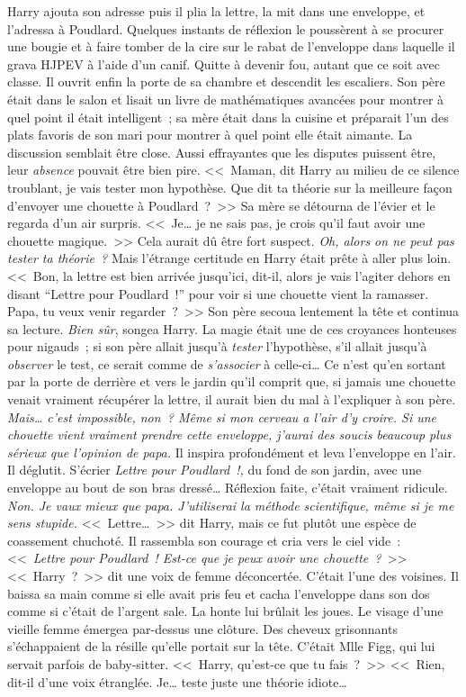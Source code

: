 Harry ajouta son adresse puis il plia la lettre, la mit dans une enveloppe, et l'adressa à Poudlard. Quelques instants de réflexion le poussèrent à se procurer une bougie et à faire tomber de la cire sur le rabat de l'enveloppe dans laquelle il grava HJPEV à l'aide d'un canif. Quitte à devenir fou, autant que ce soit avec classe.
Il ouvrit enfin la porte de sa chambre et descendit les escaliers. Son père était dans le salon et lisait un livre de mathématiques avancées pour montrer à quel point il était intelligent~; sa mère était dans la cuisine et préparait l'un des plats favoris de son mari pour montrer à quel point elle était aimante. La discussion semblait être close. Aussi effrayantes que les disputes puissent être, leur \emph{absence} pouvait être bien pire.
<<~Maman, dit Harry au milieu de ce silence troublant, je vais tester mon hypothèse. Que dit ta théorie sur la meilleure façon d'envoyer une chouette à Poudlard~?~>>
Sa mère se détourna de l'évier et le regarda d'un air surpris. <<~Je… je ne sais pas, je crois qu'il faut avoir une chouette magique.~>>
Cela aurait dû être fort suspect. \emph{Oh, alors on ne peut pas tester ta théorie~?} Mais l'étrange certitude en Harry était prête à aller plus loin.
<<~Bon, la lettre est bien arrivée jusqu'ici, dit-il, alors je vais l'agiter dehors en disant “Lettre pour Poudlard~!” pour voir si une chouette vient la ramasser. Papa, tu veux venir regarder~?~>>
Son père secoua lentement la tête et continua sa lecture. \emph{Bien sûr}, songea Harry. La magie était une de ces croyances honteuses pour nigauds~; si son père allait jusqu'à \emph{tester} l'hypothèse, s'il allait jusqu'à \emph{observer} le test, ce serait comme de \emph{s'associer} à celle-ci…
Ce n'est qu'en sortant par la porte de derrière et vers le jardin qu'il comprit que, si jamais une chouette venait vraiment récupérer la lettre, il aurait bien du mal à l'expliquer à son père.
\emph{Mais… c'est impossible, non~? Même si mon cerveau a l'air d'y croire. Si une chouette vient vraiment prendre cette enveloppe, j'aurai des soucis beaucoup plus sérieux que l'opinion de papa.}
Il inspira profondément et leva l'enveloppe en l'air.
Il déglutit.
S'écrier \emph{Lettre pour Poudlard~!,} du fond de son jardin, avec une enveloppe au bout de son bras dressé… Réflexion faite, c'était vraiment ridicule.
\emph{Non. Je vaux mieux que papa. J'utiliserai la méthode scientifique, même si je me sens stupide.}
<<~Lettre…~>> dit Harry, mais ce fut plutôt une espèce de coassement chuchoté.
Il rassembla son courage et cria vers le ciel vide~: <<~\emph{Lettre pour Poudlard~! Est-ce que je peux avoir une chouette~?}~>>
<<~Harry~?~>> dit une voix de femme déconcertée. C'était l'une des voisines.
Il baissa sa main comme si elle avait pris feu et cacha l'enveloppe dans son dos comme si c'était de l'argent sale. La honte lui brûlait les joues.
Le visage d'une vieille femme émergea par-dessus une clôture. Des cheveux grisonnants s'échappaient de la résille qu'elle portait sur la tête. C'était Mlle Figg, qui lui servait parfois de baby-sitter. <<~Harry, qu'est-ce que tu fais~?~>>
<<~Rien, dit-il d'une voix étranglée. Je… teste juste une théorie idiote…

